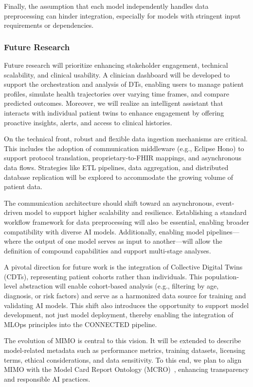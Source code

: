 Finally, the assumption that each model independently handles data preprocessing can hinder integration, especially for models with stringent input requirements or dependencies.

\subsubsection{Future Research}
Future research will prioritize enhancing stakeholder engagement, technical scalability, and clinical usability. A clinician dashboard will be developed to support the orchestration and analysis of DTs, enabling users to manage patient profiles, simulate health trajectories over varying time frames, and compare predicted outcomes. Moreover, we will realize an intelligent assistant that interacts with individual patient twins to enhance engagement by offering proactive insights, alerts, and access to clinical histories.

On the technical front, robust and flexible data ingestion mechanisms are critical. This includes the adoption of communication middleware (e.g., Eclipse Hono) to support protocol translation, proprietary-to-FHIR mappings, and asynchronous data flows. Strategies like ETL pipelines, data aggregation, and distributed database replication will be explored to accommodate the growing volume of patient data.

The communication architecture should shift toward an asynchronous, event-driven model to support higher scalability and resilience. Establishing a standard workflow framework for data preprocessing will also be essential, enabling broader compatibility with diverse AI models. Additionally, enabling model pipelines—where the output of one model serves as input to another—will allow the definition of compound capabilities and support multi-stage analyses.

A pivotal direction for future work is the integration of Collective Digital Twins (CDTs), representing patient cohorts rather than individuals. This population-level abstraction will enable cohort-based analysis (e.g., filtering by age, diagnosis, or risk factors) and serve as a harmonized data source for training and validating AI models. This shift also introduces the opportunity to support model development, not just model deployment, thereby enabling the integration of MLOps principles into the CONNECTED pipeline.

The evolution of MIMO is central to this vision. It will be extended to describe model-related metadata such as performance metrics, training datasets, licensing terms, ethical considerations, and data sensitivity. To this end, we plan to align MIMO with the Model Card Report Ontology (MCRO)~\cite{Amith2022}, enhancing transparency and responsible AI practices.

